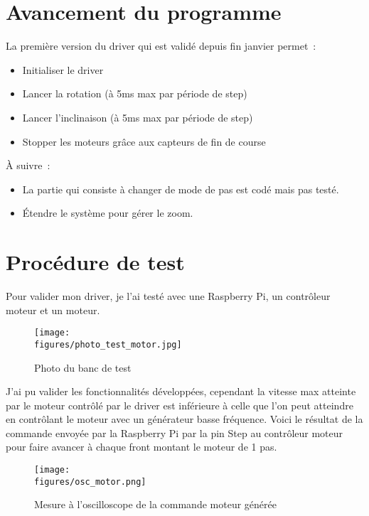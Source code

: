\section{Avancement du programme}

La première version du driver qui est validé depuis fin janvier permet~:
\begin{itemize}[label=$\bullet$]
	\item Initialiser le driver
	\item Lancer la rotation (à 5ms max par période de step)
	\item Lancer l’inclinaison (à 5ms max par période de step)
	\item Stopper les moteurs grâce aux capteurs de fin de course
	\end{itemize}

\vspace{1cm}

À suivre~:
\begin{itemize}[label=$\bullet$]
	\item La partie qui consiste à changer de mode de pas est codé mais pas testé.
	\item Étendre le système pour gérer le zoom.
	\end{itemize}

\section{Procédure de test}

Pour valider mon driver, je l’ai testé avec une Raspberry Pi, un contrôleur moteur et un moteur.

\begin{figure}[H]
    \centering
    \texttt{[image: \\figures/photo\_test\_motor.jpg]}
    \decoRule
    \caption[
    Photo du banc de test]{
	Photo du banc de test}
    \label{fig:Photo du banc de test}
    \end{figure}

\vspace{1cm}

J’ai pu valider les fonctionnalités développées, cependant la vitesse max atteinte par le moteur contrôlé par le driver est inférieure à celle que l'on peut atteindre en contrôlant le moteur avec un générateur basse fréquence.
Voici le résultat de la commande envoyée par la Raspberry Pi par la pin Step au contrôleur moteur pour faire avancer à chaque front montant le moteur de 1 pas.

\begin{figure}[H]
    \centering
    \texttt{[image: \\figures/osc\_motor.png]}
    \decoRule
    \caption[
    Mesure à l'oscilloscope de la commande moteur générée]{
	Mesure à l'oscilloscope de la commande moteur générée}
    \label{fig:Mesure à l'oscilloscope de la commande moteur générée}
    \end{figure}

